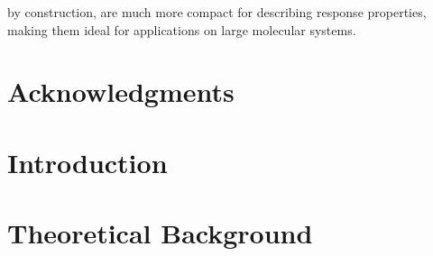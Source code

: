 \documentclass[12pt]{report}
\begin{document}
by construction, are much more compact for describing response properties, making them ideal
for applications on large molecular systems.
\chapter*{Acknowledgments}
\setcounter{page}{7}


\tableofcontents
\pagebreak

\listoffigures
\pagebreak

\listoftables
\pagebreak

\pagestyle{myheadings}

\def\ket#1{| #1 \rangle}
\def\bra#1{\langle #1 |}
\def\bm#1{\mbox{\boldmath $#1$}}
\def\degrees{deg dm$^{-1}$ (g/mL)$^{-1}$}
\def\optrot{$[\alpha]$}
\def\crt#1{a_{#1}^{\dagger}}
\def\ann#1{a_{#1}^{\ }}
\def\cgs{($10^{-40}$ cgs)}

\pagestyle{plain}
\chapter{Introduction}

\chapter{Theoretical Background}

\end{document}
